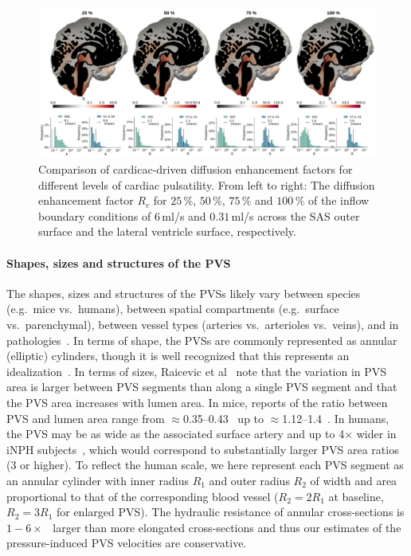 \documentclass[fleqn,10pt]{wlscirep}
\begin{document}
\begin{figure}
    \centering
    \includegraphics[width=1.0\linewidth]{paper/figures/cardiac_R_comparison.png}
    \caption{Comparison of cardicac-driven diffusion enhancement factors for different levels of cardiac pulsatility. From left to right: The diffusion enhancement factor $R_c$ for $25\,\%$, $50\,\%$, $75\,\%$ and $100\,\%$ of the inflow boundary conditions of $6\,$ml/s and $0.31\,$ml/s across the SAS outer surface and the lateral ventricle surface, respectively.}
    \label{fig:R_comparison}
\end{figure}

\paragraph{Shapes, sizes and structures of the PVS}
The shapes, sizes and structures of the PVSs likely vary between
species (e.g.~mice vs.~humans), between spatial compartments
(e.g.~surface vs.~parenchymal), between vessel types (arteries
vs.~arterioles vs.~veins), and in
pathologies~\cite{ichimura1991distribution, foley2012realtime,
  schain2017cortical, mestre2018flow, bedussi2018paravascular,
  mestre2022periarteriolar, smets2024perivascular, raicevic2023sizes,
  vinje2021brain, eide2024functional}. In terms of shape, the PVSs are
commonly represented as annular (elliptic) cylinders, though it is
well recognized that this represents an
idealization~\cite{mestre2018flow, tithof2019hydraulic,
  vinje2021brain, raicevic2023sizes, boster2024hydraulic,
  smets2024perivascular}. In terms of sizes, Raicevic et
al~\cite{raicevic2023sizes} note that the variation in PVS area is
larger between PVS segments than along a single PVS segment and that
the PVS area increases with lumen area. In mice, reports of the ratio
between PVS and lumen area range from
$\approx$0.35--0.43~\cite{smets2024perivascular} up to
$\approx$1.12--1.4~\cite{raicevic2023sizes, mestre2018flow}. In
humans, the PVS may be as wide as the associated surface artery and up
to 4$\times$ wider in iNPH subjects~\cite{eide2024functional}, which
would correspond to substantially larger PVS area ratios (3 or
higher). To reflect the human scale, we here represent each PVS
segment as an annular cylinder with inner radius $R_1$ and outer
radius $R_2$ of width and area proportional to that of the
corresponding blood vessel ($R_2 = 2 R_1$ at baseline, $R_2 = 3 R_1$
for enlarged PVS). The hydraulic resistance of annular cross-sections
is $1-6 \times$~\cite{tithof2019hydraulic} larger than more elongated
cross-sections and thus our estimates of the pressure-induced PVS
velocities are conservative.
\end{document}
